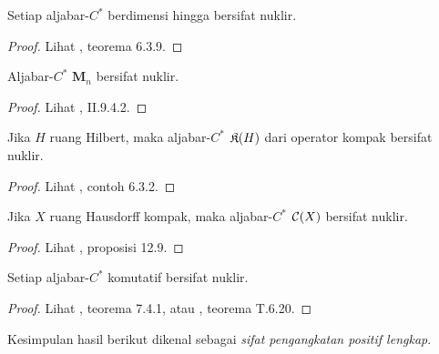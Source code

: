 \begin{exam}\label{0058513} Setiap aljabar-$C^*$ berdimensi hingga bersifat nuklir.
\end{exam}

\begin{proof} Lihat \cite{Murphy:1990}, teorema 6.3.9.  \ns \end{proof}

\begin{exam}\label{0058514} Aljabar-$C^*$ $\mathbf M_n$
bersifat nuklir.
\end{exam}
\begin{proof} Lihat \cite{Blackadar:2006}, II.9.4.2.  \ns \end{proof}

\begin{exam}\label{0058515} Jika $H$ ruang Hilbert,
maka aljabar-$C^*$ $\mathfrak{K}(H)$ dari operator kompak bersifat nuklir.
\end{exam}
\begin{proof} Lihat \cite{Murphy:1990}, contoh 6.3.2.  \ns \end{proof}

\begin{exam}\label{0058517} Jika $X$ ruang Hausdorff kompak, maka aljabar-$C^*$
$\mathcal{C}(X)$ bersifat nuklir.
\end{exam}

\begin{proof} Lihat \cite{Paulsen:2002}, proposisi 12.9.  \ns \end{proof}

\begin{exam}\label{0058519} Setiap aljabar-$C^*$ komutatif bersifat nuklir.
\end{exam}

\begin{proof} Lihat \cite{Fillmore:1996}, teorema 7.4.1, atau \cite{Wegge-Olsen:1993}, teorema
T.6.20. \ns
\end{proof}

Kesimpulan hasil berikut dikenal sebagai
\emph{sifat pengangkatan positif lengkap}.

